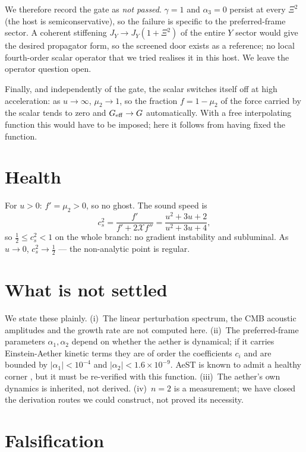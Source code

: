 \documentclass[useAMS,usenatbib]{mnras}
\begin{document}
We therefore record the gate as \emph{not passed}.  $\gamma=1$ and
$\alpha_3=0$ persist at every $\Xi^2$ (the host is semiconservative), so the
failure is specific to the preferred-frame sector.  A coherent stiffening
$J_Y\to J_Y(1+\Xi^2)$ of the entire $Y$ sector would give the desired
propagator form, so the screened door exists as a reference; no local
fourth-order scalar operator that we tried realises it in this host.  We
leave the operator question open.

Finally, and independently of the gate, the scalar switches itself off at
high acceleration: as $u\to\infty$, $\mu_2\to1$, so the fraction $f=1-\mu_2$
of the force carried by the scalar tends to zero and $G_{\rm eff}\to G$
automatically.  With a free interpolating function this would have to be
imposed; here it follows from having fixed the function.

\section{Health}

For $u>0$: $f'=\mu_2>0$, so no ghost.  The sound speed is
\begin{equation}
c_s^2=\frac{f'}{f'+2\mathcal{X}f''}=\frac{u^2+3u+2}{u^2+3u+4},
\end{equation}
so $\tfrac12\le c_s^2<1$ on the whole branch: no gradient instability and
subluminal.  As $u\to0$, $c_s^2\to\tfrac12$ --- the non-analytic point is
regular.

\section{What is not settled}

We state these plainly.  (i)~The linear perturbation spectrum, the CMB
acoustic amplitudes and the growth rate are not computed here.
(ii)~The preferred-frame parameters $\alpha_1,\alpha_2$ depend on whether
the aether is dynamical; if it carries Einstein-Aether kinetic terms they are
of order the coefficients $c_i$ and are bounded by
$|\alpha_1|<10^{-4}$ and $|\alpha_2|<1.6\times10^{-9}$.  AeST is known to
admit a healthy corner \citep{SkordisZlosnik2021}, but it must be
re-verified with this function.  (iii)~The aether's own dynamics is
inherited, not derived.  (iv)~$n=2$ is a measurement; we have closed the
derivation routes we could construct, not proved its necessity.

\section{Falsification}
\end{document}

